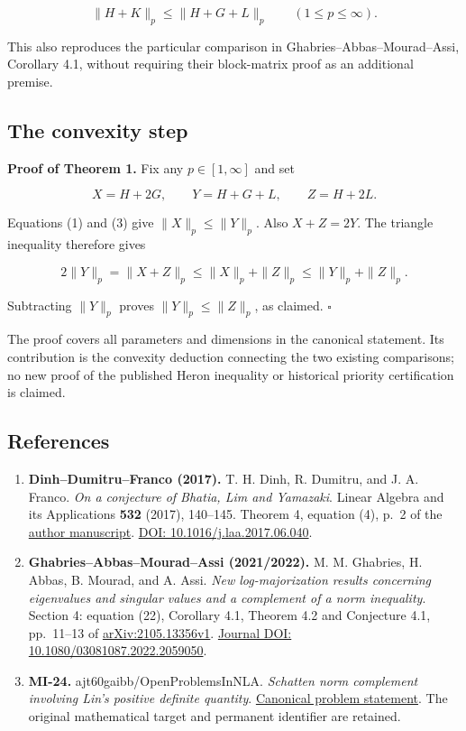 \documentclass[10pt,a4paper]{article}
\begin{document}
\[
\|H+K\|_p\le\|H+G+L\|_p \qquad(1\le p\le\infty). \tag{3}
\]

This also reproduces the particular comparison in
Ghabries--Abbas--Mourad--Assi, Corollary 4.1, without requiring their
block-matrix proof as an additional premise.

\subsection{The convexity step}\label{the-convexity-step}

\textbf{Proof of Theorem 1.} Fix any \(p\in[1,\infty]\) and set

\[
X=H+2G,\qquad Y=H+G+L,\qquad Z=H+2L.
\]

Equations (1) and (3) give \(\|X\|_p\le\|Y\|_p\). Also \(X+Z=2Y\). The
triangle inequality therefore gives

\[
2\|Y\|_p=\|X+Z\|_p
\le\|X\|_p+\|Z\|_p
\le\|Y\|_p+\|Z\|_p.
\]

Subtracting \(\|Y\|_p\) proves \(\|Y\|_p\le\|Z\|_p\), as claimed.
\(\square\)

The proof covers all parameters and dimensions in the canonical
statement. Its contribution is the convexity deduction connecting the
two existing comparisons; no new proof of the published Heron inequality
or historical priority certification is claimed.

\subsection{References}\label{references}

\begin{enumerate}
\def\labelenumi{\arabic{enumi}.}
\item
  \textbf{Dinh--Dumitru--Franco (2017).} T. H. Dinh, R. Dumitru, and J.
  A. Franco. \emph{On a conjecture of Bhatia, Lim and Yamazaki}. Linear
  Algebra and its Applications \textbf{532} (2017), 140--145. Theorem 4,
  equation (4), p.~2 of the
  \href{https://trunghoamath.wordpress.com/wp-content/uploads/2017/06/p_t_q_t-4-2.pdf}{author
  manuscript}. \href{https://doi.org/10.1016/j.laa.2017.06.040}{DOI:
  10.1016/j.laa.2017.06.040}.
\item
  \textbf{Ghabries--Abbas--Mourad--Assi (2021/2022).} M. M. Ghabries, H.
  Abbas, B. Mourad, and A. Assi. \emph{New log-majorization results
  concerning eigenvalues and singular values and a complement of a norm
  inequality}. Section 4: equation (22), Corollary 4.1, Theorem 4.2 and
  Conjecture 4.1, pp.~11--13 of
  \href{https://arxiv.org/abs/2105.13356v1}{arXiv:2105.13356v1}.
  \href{https://doi.org/10.1080/03081087.2022.2059050}{Journal DOI:
  10.1080/03081087.2022.2059050}.
\item
  \textbf{MI-24.} ajt60gaibb/OpenProblemsInNLA. \emph{Schatten norm
  complement involving Lin's positive definite quantity}.
  \href{https://github.com/ajt60gaibb/OpenProblemsInNLA/blob/main/matrix-inequalities-and-norms/MI-24/README.md}{Canonical
  problem statement}. The original mathematical target and permanent
  identifier are retained.
\end{enumerate}
\end{document}
